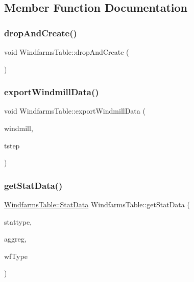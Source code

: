 \subsection{Member Function Documentation}
\mbox{\label{class_windfarms_table_aab2a278f7454d62d77d37b048da1a5c1}} 
\subsubsection{\texorpdfstring{dropAndCreate()}{dropAndCreate()}}
{\footnotesize\ttfamily void Windfarms\+Table\+::drop\+And\+Create (\begin{DoxyParamCaption}{ }\end{DoxyParamCaption})}

\mbox{\label{class_windfarms_table_a91aa9c6965213361b5e1fc151976d9ca}} 
\subsubsection{\texorpdfstring{exportWindmillData()}{exportWindmillData()}}
{\footnotesize\ttfamily void Windfarms\+Table\+::export\+Windmill\+Data (\begin{DoxyParamCaption}\item[{\mbox{\hyperlink{class_windmill}{Windmill}} $\ast$}]{windmill,  }\item[{int}]{tstep }\end{DoxyParamCaption})}

\mbox{\label{class_windfarms_table_adb850840c3750a4842783990bcd423a0}} 
\subsubsection{\texorpdfstring{getStatData()}{getStatData()}\hspace{0.1cm}{\footnotesize\ttfamily [1/2]}}
{\footnotesize\ttfamily \mbox{\hyperlink{struct_windfarms_table_1_1_stat_data}{Windfarms\+Table\+::\+Stat\+Data}} Windfarms\+Table\+::get\+Stat\+Data (\begin{DoxyParamCaption}\item[{\mbox{\hyperlink{class_windfarms_table_a882699395a936d2997b9482c08fe8515}{Windfarms\+Table\+::\+Stat\+Type}}}]{stattype,  }\item[{\mbox{\hyperlink{class_windfarms_table_a59a8562d196d503dd3420e06a4613696}{Windfarms\+Table\+::\+Aggreg}}}]{aggreg,  }\item[{int}]{wf\+Type }\end{DoxyParamCaption})}

